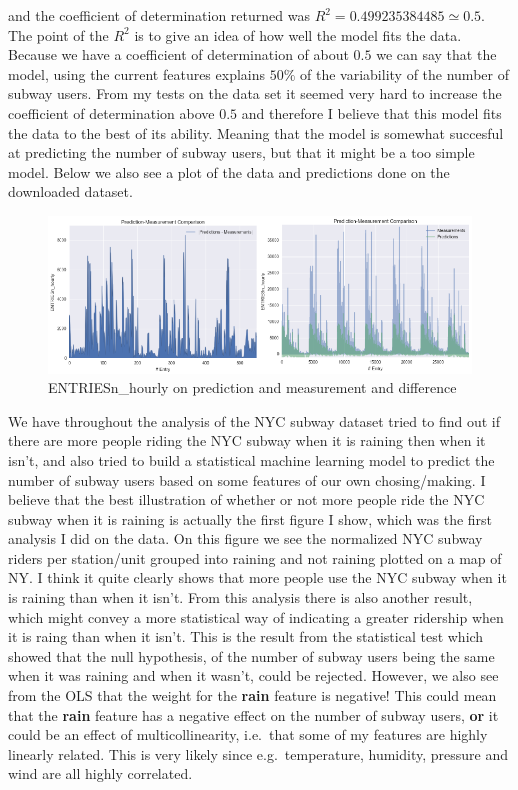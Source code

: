 \documentclass{article}
\begin{document}
and the coefficient of determination returned was
\(R^2 = 0.499235384485 \simeq 0.5\). The point of the \(R^2\) is to give
an idea of how well the model fits the data. Because we have a
coefficient of determination of about \(0.5\) we can say that the model,
using the current features explains \(50\%\) of the variability of the
number of subway users. From my tests on the data set it seemed very
hard to increase the coefficient of determination above \(0.5\) and
therefore I believe that this model fits the data to the best of its
ability. Meaning that the model is somewhat succesful at predicting the
number of subway users, but that it might be a too simple model. Below
we also see a plot of the data and predictions done on the downloaded
dataset.

\begin{figure}[htbp]
\centering
\includegraphics{prediction_measurement.png}
\caption{ENTRIESn\_hourly on prediction and measurement and difference}
\end{figure}

We have throughout the analysis of the NYC subway dataset tried to find
out if there are more people riding the NYC subway when it is raining
then when it isn't, and also tried to build a statistical machine
learning model to predict the number of subway users based on some
features of our own chosing/making. I believe that the best illustration
of whether or not more people ride the NYC subway when it is raining is
actually the first figure I show, which was the first analysis I did on
the data. On this figure we see the normalized NYC subway riders per
station/unit grouped into raining and not raining plotted on a map of
NY. I think it quite clearly shows that more people use the NYC subway
when it is raining than when it isn't. From this analysis there is also
another result, which might convey a more statistical way of indicating
a greater ridership when it is raing than when it isn't. This is the
result from the statistical test which showed that the null hypothesis,
of the number of subway users being the same when it was raining and
when it wasn't, could be rejected. However, we also see from the OLS
that the weight for the \textbf{rain} feature is negative! This could
mean that the \textbf{rain} feature has a negative effect on the number
of subway users, \textbf{or} it could be an effect of multicollinearity,
i.e.~that some of my features are highly linearly related. This is very
likely since e.g.~temperature, humidity, pressure and wind are all
highly correlated.
\end{document}
